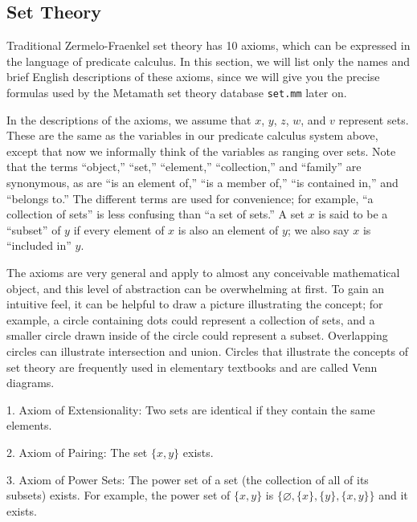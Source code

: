 \subsection{Set Theory}

Traditional Zermelo-Fraenkel set theory has 10 axioms, which can be expressed in the
language of predicate calculus.  In this section, we will list only the
names and brief English descriptions of these axioms, since we will give
you the precise formulas used by the Metamath set theory
database \texttt{set.mm} later on.

In the descriptions of the axioms, we assume that $x$, $y$, $z$, $w$, and $v$
represent sets.  These are the same as the variables in our predicate calculus system above, except that now we informally
think of the variables as ranging over sets.  Note that the terms
``object,'' ``set,'' ``element,''
``collection,'' and ``family'' are synonymous,
as are ``is an element of,'' ``is a member of,'' ``is contained
in,'' and ``belongs to.''  The different terms are used for convenience; for
example, ``a collection of sets'' is less confusing than ``a set of sets.''
A set $x$ is said to be a ``subset'' of $y$ if every element of
$x$ is also an element of $y$; we also say $x$ is ``included in''
$y$.

The axioms are very general and apply to almost any conceivable mathematical
object, and this level of abstraction can be overwhelming at first.  To gain an
intuitive feel, it can be helpful to draw a picture illustrating the concept;
for example, a circle containing dots could represent a collection of sets,
and a smaller circle drawn inside of the circle could represent a subset.
Overlapping circles can illustrate intersection and union.  Circles that
illustrate the concepts of set theory are frequently used in elementary
textbooks and are called Venn diagrams.

1. Axiom of Extensionality:  Two sets are identical if they contain the same
   elements.

2. Axiom of Pairing:  The set $\{ x , y \}$ exists.

3. Axiom of Power Sets:  The power set of a set (the collection of all of
   its subsets) exists.  For example, the power set of $\{x,y\}$ is
   $\{\varnothing,\{x\},\{y\},\{x,y\}\}$ and it exists.

